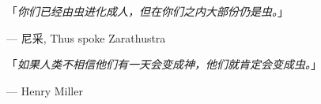 \documentclass[orivec]{llncs}
\begin{document}
\noindent 「\textit{你们已经由虫进化成人，但在你们之内大部份仍是虫。}」

\hfill --- 尼采, Thus spoke Zarathustra

\noindent 「\textit{如果人类不相信他们有一天会变成神，他们就肯定会变成虫。}」

\hfill --- Henry Miller

\end{document}
